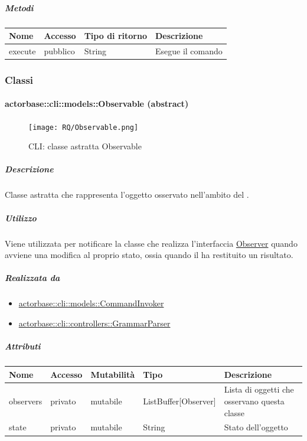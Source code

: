 \documentclass{scalatekids-article}
\begin{document}
\subparagraph{Metodi}

\begin{tabular}{| l | l | l | l |}
  \hline
  Nome & Accesso & Tipo di ritorno & Descrizione\\
  \hline
  execute & pubblico & String & Esegue il comando\\
  \hline
\end{tabular}

\subsubsection{Classi}
\paragraph{actorbase::cli::models::Observable (abstract)}
\label{sec:actorbase::cli::models::Observable}

\begin{figure}[H]
  \begin{center}
    \texttt{[image: RQ/Observable.png]}
    \caption{CLI: classe astratta Observable}
  \end{center}
\end{figure}

\subparagraph{Descrizione}
Classe astratta che rappresenta l'oggetto osservato nell'ambito del  .

\subparagraph{Utilizzo}

Viene utilizzata per notificare la classe che realizza l'interfaccia \hyperref[sec:actorbase::cli::views::Observer]{Observer}
quando avviene una modifica al proprio stato, ossia quando il 
ha restituito un risultato.

\subparagraph{Realizzata da}
\begin{itemize}
\item \hyperref[sec:actorbase::cli::models::CommandInvoker]{actorbase::cli::models::CommandInvoker}
\item \hyperref[sec:actorbase::cli::controllers::GrammarParser]{actorbase::cli::controllers::GrammarParser}
\end{itemize}

\subparagraph{Attributi}

\begin{tabular}{| p{1.5cm} | p{1.5cm} | p{2cm} | p{3.5cm} | p{8.5cm} |}
  \hline
  Nome & Accesso & Mutabilità & Tipo & Descrizione\\
  \hline
  observers & privato & mutabile & ListBuffer[Observer] & Lista di oggetti che osservano questa classe\\
  \hline
  state & privato & mutabile & String & Stato dell'oggetto\\
  \hline
\end{tabular}
\end{document}
